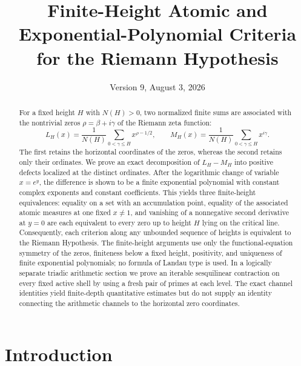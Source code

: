 \documentclass[11pt]{amsart}
\title[Finite-Height Exponential Criteria]{Finite-Height Atomic and Exponential-Polynomial Criteria for the Riemann Hypothesis}
\author{}
\date{Version 9, August 3, 2026}
\numberwithin{equation}{section}
\theoremstyle{plain}
\theoremstyle{definition}
\theoremstyle{remark}
\begin{document}
\begin{abstract}
For a fixed height $H$ with $N(H)>0$, two normalized finite sums are associated with the nontrivial zeros $\rho=\beta+i\gamma$ of the Riemann zeta function:
\begin{equation}
L_H(x)=\frac{1}{N(H)}\sum_{0<\gamma\leq H}x^{\rho-1/2},
\qquad
M_H(x)=\frac{1}{N(H)}\sum_{0<\gamma\leq H}x^{i\gamma}.
\label{eq:abstract_definitions}
\end{equation}
The first retains the horizontal coordinates of the zeros, whereas the second retains only their ordinates.  We prove an exact decomposition of $L_H-M_H$ into positive defects localized at the distinct ordinates.  After the logarithmic change of variable $x=e^y$, the difference is shown to be a finite exponential polynomial with constant complex exponents and constant coefficients.  This yields three finite-height equivalences: equality on a set with an accumulation point, equality of the associated atomic measures at one fixed $x\neq1$, and vanishing of a nonnegative second derivative at $y=0$ are each equivalent to every zero up to height $H$ lying on the critical line.  Consequently, each criterion along any unbounded sequence of heights is equivalent to the Riemann Hypothesis.  The finite-height arguments use only the functional-equation symmetry of the zeros, finiteness below a fixed height, positivity, and uniqueness of finite exponential polynomials; no formula of Landau type is used.  In a logically separate triadic arithmetic section we prove an iterable sesquilinear contraction on every fixed active shell by using a fresh pair of primes at each level.  The exact channel identities yield finite-depth quantitative estimates but do not supply an identity connecting the arithmetic channels to the horizontal zero coordinates.  
\end{abstract}

\maketitle
\tableofcontents
\bigskip

\section{Introduction}
\label{sec:introduction}
\end{document}

